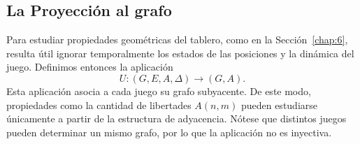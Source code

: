 	
	
	\subsection*{La Proyección al grafo}
	
	Para estudiar propiedades geométricas del tablero, como en la Sección~\ref{chap:6}, resulta útil ignorar temporalmente los estados de las posiciones y la dinámica del juego.
	Definimos entonces la aplicación
	\[U:(G,E,A,\Delta)\to (G,A).\]
	Esta aplicación asocia a cada juego su grafo subyacente. De este modo, propiedades como la cantidad de libertades \(A(n,m)\) pueden estudiarse únicamente a partir de la estructura de adyacencia.
	Nótese que distintos juegos pueden determinar un mismo grafo, por lo que la aplicación no es inyectiva.
